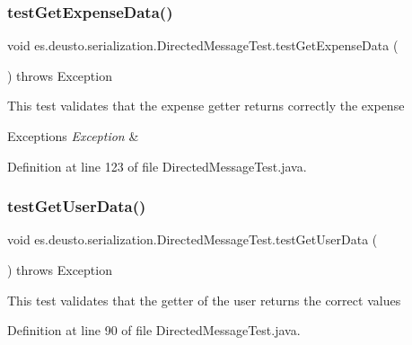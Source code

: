 \subsubsection{\texorpdfstring{test\+Get\+Expense\+Data()}{testGetExpenseData()}}
{\footnotesize\ttfamily void es.\+deusto.\+serialization.\+Directed\+Message\+Test.\+test\+Get\+Expense\+Data (\begin{DoxyParamCaption}{ }\end{DoxyParamCaption}) throws Exception}

This test validates that the expense getter returns correctly the expense 
\begin{DoxyExceptions}{Exceptions}
{\em Exception} & \\
\hline
\end{DoxyExceptions}


Definition at line 123 of file Directed\+Message\+Test.\+java.

\mbox{\label{classes_1_1deusto_1_1serialization_1_1_directed_message_test_a35a07f027c5c110942644ebe2ac429b9}} 
\subsubsection{\texorpdfstring{test\+Get\+User\+Data()}{testGetUserData()}}
{\footnotesize\ttfamily void es.\+deusto.\+serialization.\+Directed\+Message\+Test.\+test\+Get\+User\+Data (\begin{DoxyParamCaption}{ }\end{DoxyParamCaption}) throws Exception}

This test validates that the getter of the user returns the correct values 

Definition at line 90 of file Directed\+Message\+Test.\+java.

\mbox{\label{classes_1_1deusto_1_1serialization_1_1_directed_message_test_abe0459a79b0888b65191c8662fdad324}} 
